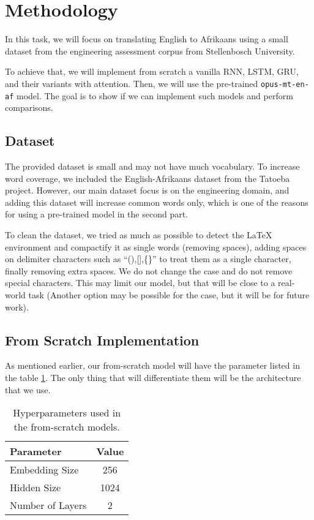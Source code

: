 \section{Methodology}
In this task, we will focus on translating English to Afrikaans using a small dataset from the engineering assessment corpus from Stellenbosch University.

To achieve that, we will implement from scratch a vanilla RNN, LSTM, GRU, and their variants with attention. Then, we will use the pre-trained \texttt{opus-mt-en-af} model. The goal is to show if we can implement such models and perform comparisons.


\subsection{Dataset}
The provided dataset is small and may not have much vocabulary. To increase word coverage, we included the English-Afrikaans dataset from the Tatoeba project. However, our main dataset focus is on the engineering domain, and adding this dataset will increase common words only, which is one of the reasons for using a pre-trained model in the second part.

To clean the dataset, we tried as much as possible to detect the LaTeX environment and compactify it as single words (removing spaces), adding spaces on delimiter characters such as ``(),[],\{\}'' to treat them as a single character, finally removing extra spaces. We do not change the case and do not remove special characters. This may limit our model, but that will be close to a real-world task (Another option may be possible for the case, but it will be for future work).

\subsection{From Scratch Implementation}
As mentioned earlier, our from-scratch model will have the parameter listed in the table \ref{tab:hyper}. The only thing that will differentiate them will be the architecture that we use. 
\begin{table}[H]
    \centering
    \begin{tabular}{lc}
        \toprule
 Parameter & Value \\
        \midrule
 Embedding Size & 256 \\
 Hidden Size & 1024 \\
 Number of Layers & 2 \\
        \bottomrule
    \end{tabular}
    \caption{Hyperparameters used in the from-scratch models.}
    \label{tab:hyper}
\end{table}

